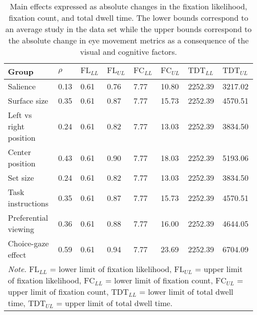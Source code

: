 \begin{table}[ht]
\centering
\caption{Main effects expressed as absolute changes in the fixation likelihood, fixation count, and total dwell time. The lower bounds correspond to an average study in the data set while the upper bounds correspond to the absolute change in eye movement metrics as a consequence of the visual and cognitive factors.} 
\label{tab:em_results}
\begingroup\small
\begin{tabular}{p{3.7cm}p{1.2cm}p{1.3cm}p{1.3cm}p{1.3cm}p{1.3cm}p{1.6cm}p{1.6cm}}
  \hline
Group & $\rho$ & $\textrm{FL}_{LL}$ & $\textrm{FL}_{UL}$ & $\textrm{FC}_{LL}$ & $\textrm{FC}_{UL}$ & $\textrm{TDT}_{LL}$ & $\textrm{TDT}_{UL}$ \\ 
  \hline
Salience & 0.13 & 0.61 & 0.76 & 7.77 & 10.80 & 2252.39 & 3217.02 \\ 
  Surface size & 0.35 & 0.61 & 0.87 & 7.77 & 15.73 & 2252.39 & 4570.51 \\ 
  Left vs right position & 0.24 & 0.61 & 0.82 & 7.77 & 13.03 & 2252.39 & 3834.50 \\ 
  Center position & 0.43 & 0.61 & 0.90 & 7.77 & 18.03 & 2252.39 & 5193.06 \\ 
  Set size & 0.24 & 0.61 & 0.82 & 7.77 & 13.03 & 2252.39 & 3834.50 \\ 
  Task instructions & 0.35 & 0.61 & 0.87 & 7.77 & 15.73 & 2252.39 & 4570.51 \\ 
  Preferential viewing & 0.36 & 0.61 & 0.88 & 7.77 & 16.00 & 2252.39 & 4644.05 \\ 
  Choice-gaze effect & 0.59 & 0.61 & 0.94 & 7.77 & 23.69 & 2252.39 & 6704.09 \\ 
   \hline 
 \multicolumn{8}{p{0.95\textwidth}}{\scriptsize{\textit{Note.} $\textrm{FL}_{LL}$ = lower limit of fixation likelihood, $\textrm{FL}_{UL}$ = upper limit of fixation likelihood, $\textrm{FC}_{LL}$ = lower limit of fixation count, $\textrm{FC}_{UL}$ = upper limit of fixation count, $\textrm{TDT}_{LL}$ = lower limit of total dwell time, $\textrm{TDT}_{UL}$ = upper limit of total dwell time.}} 
\end{tabular}
\endgroup
\end{table}
